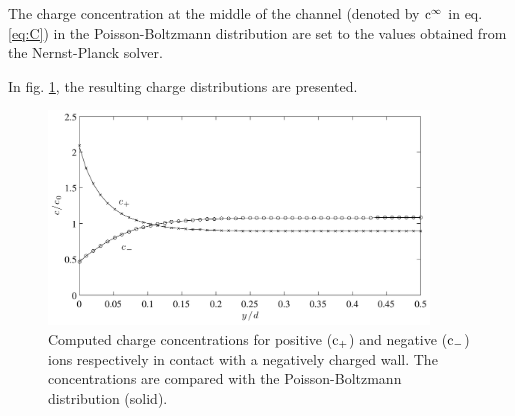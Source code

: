 The charge concentration at the middle of the channel (denoted by
$\mathrm{c}^{\infty}$ in eq. \eqref{eq:C}) in the Poisson-Boltzmann distribution
are set to the values obtained from the Nernst-Planck solver. 

In fig. \ref{fig:mb:np}, the resulting charge distributions are
presented.  

\begin{figure}
\begin{center}
\includegraphics[width=0.9\textwidth]{fig/np_bench.pdf}
\end{center}
\caption{Computed charge concentrations for positive ($\mathrm{c}_+$) and
  negative ($\mathrm{c}_{-}$) ions respectively in contact with a negatively
  charged wall. The concentrations are compared with the
  Poisson-Boltzmann distribution (solid).}
\label{fig:mb:np}
\end{figure}


